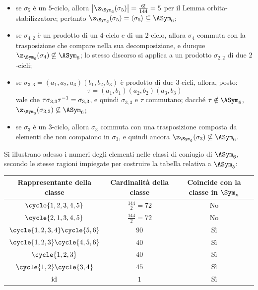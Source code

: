 \documentclass[11pt]{scrartcl}
\begin{document}
	\begin{itemize}
		\item se $\sigma_5$ è un $5$-ciclo, allora $\abs{\z_{\Sym_6}(\sigma_5)} = \frac{6!}{144} = 5$ per il Lemma orbita-stabilizzatore; pertanto
		$\z_{\Sym_6}(\sigma_5) = \langle \sigma_5 \rangle \subseteq \ASym_6$;
		\item se $\sigma_{4,2}$ è un prodotto di un $4$-ciclo e di un $2$-ciclo, allora
		$\sigma_4$ commuta con la trasposizione che compare nella sua decomposizione,
		e dunque $\z_{\Sym_6}(\sigma_4) \not\subseteq \ASym_6$; lo stesso
		discorso si applica a un prodotto $\sigma_{2,2}$ di due $2$-cicli;
		\item se $\sigma_{3,3} = (a_1, a_2, a_3)(b_1, b_2, b_3)$ è prodotto di due $3$-cicli,
		allora, posto:
		\[ \tau = (a_1, b_1)(a_2, b_2)(a_3, b_3) \]
		vale che
		$\tau \sigma_{3,3} \tau^{-1} = \sigma_{3,3}$, e quindi $\sigma_{3,3}$ e $\tau$
		commutano; dacché $\tau \notin \ASym_6$, $\z_{\Sym_6}(\sigma_{3,3}) \not\subseteq \ASym_6$;
		\item se $\sigma_3$ è un $3$-ciclo, allora $\sigma_3$ commuta con una trasposizione
		composta da elementi che non compaiono in $\sigma_3$, e quindi ancora
		$\z_{\Sym_6}(\sigma_{3}) \not\subseteq \ASym_6$.
	\end{itemize}
	
	Si illustrano adesso i numeri degli elementi nelle classi di coniugio di
	$\ASym_6$, secondo le stesse ragioni impiegate per costruire la tabella
	relativa a $\ASym_5$:
	
	\begingroup
	\renewcommand{\arraystretch}{1.5}
	\begin{center}
		\begin{tabular}{c|c|c}
			Rappresentante della classe & Cardinalità della classe & Coincide con la classe in $\Sym_n$ \\
			\hline
			$\cycle{1, 2, 3, 4, 5}$ & $\frac{144}{2} = 72$ & No \\
			$\cycle{2, 1, 3, 4, 5}$ & $\frac{144}{2} = 72$ & No \\
			$\cycle{1, 2, 3, 4} \cycle{5, 6}$ & $90$ & Sì \\
			$\cycle{1, 2, 3} \cycle{4, 5, 6}$ & $40$ & Sì \\
			$\cycle{1, 2, 3}$ & $40$ & Sì \\
			$\cycle{1, 2} \cycle{3, 4}$ & $45$ & Sì \\
			$\mathrm{id}$ & $1$ & Sì 
		\end{tabular}
	\end{center}
	\endgroup
	
\end{document}
